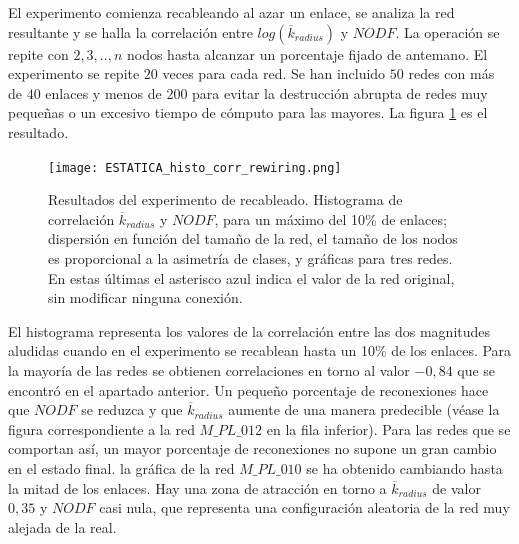 El experimento comienza recableando al azar un enlace, se analiza la red resultante y se halla la correlación entre $log(\overline {k}_{radius})$  y $NODF$. La operación se repite con $2,3,..,n$ nodos hasta alcanzar un porcentaje fijado de antemano. El experimento se repite $20$ veces para cada red. Se han incluido $50$  redes con más de $40$ enlaces y menos de $200$ para evitar la destrucción abrupta de redes muy pequeñas o un excesivo tiempo de cómputo para las mayores. La figura \ref{fig:ESTATICA_histo_corr_rewiring} es el resultado.

\begin{figure}[h!]
\centering
\texttt{[image: ESTATICA\_histo\_corr\_rewiring.png]}
\caption {Resultados del experimento de recableado. Histograma de correlación $\overline {k}_{radius}$ y $NODF$, para un máximo del 10\% de enlaces; dispersión en función del tamaño de la red, el tamaño de los nodos es proporcional a la asimetría de clases, y gráficas para tres redes. En estas últimas el asterisco azul indica el valor de la red original, sin modificar ninguna conexión.}
\label{fig:ESTATICA_histo_corr_rewiring}
\end{figure}

El histograma representa los valores de la correlación entre las dos magnitudes aludidas cuando en el experimento se recablean hasta un 10\% de los enlaces. Para la mayoría de las redes se obtienen correlaciones en torno al valor $-0,84$ que se encontró en el apartado anterior. Un pequeño porcentaje de reconexiones hace que $NODF$ se reduzca y que $\overline {k}_{radius}$ aumente de una manera predecible (véase la figura correspondiente a la red $M\_PL\_012$ en la fila inferior). Para las redes que se comportan así, un mayor porcentaje de reconexiones no supone un gran cambio en el estado final. la gráfica de la red $M\_PL\_010$ se ha obtenido cambiando hasta la mitad de los enlaces. Hay una zona de atracción en torno a $\overline {k}_{radius}$ de valor $0,35$ y $NODF$ casi nula, que representa una configuración aleatoria de la red muy alejada de la real.

